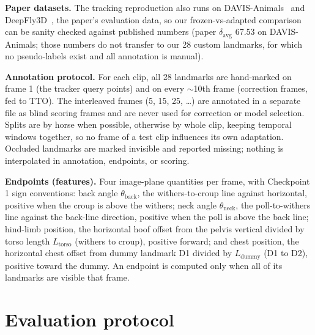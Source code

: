\documentclass[11pt]{article}
\begin{document}
\textbf{Paper datasets.} The tracking reproduction also runs on
DAVIS-Animals~\cite{davis} and DeepFly3D~\cite{deepfly3d}, the paper's
evaluation data, so our frozen-vs-adapted comparison can be sanity
checked against published numbers (paper $\delta_{\text{avg}}$ 67.53 on
DAVIS-Animals; those numbers do not transfer to our 28 custom
landmarks, for which no pseudo-labels exist and all annotation is
manual).

\textbf{Annotation protocol.} For each clip, all 28 landmarks are
hand-marked on frame 1 (the tracker query points) and on every
$\sim$10th frame (correction frames, fed to TTO). The interleaved
frames (5, 15, 25, \dots) are annotated in a separate file as blind
scoring frames and are never used for correction or model selection.
Splits are by horse when possible, otherwise by whole clip, keeping
temporal windows together, so no frame of a test clip influences its
own adaptation. Occluded landmarks are marked invisible and reported
missing; nothing is interpolated in annotation, endpoints, or scoring.

\textbf{Endpoints (features).} Four image-plane quantities per frame,
with Checkpoint 1 sign conventions: back angle
$\theta_{\text{back}}$, the withers-to-croup line against horizontal,
positive when the croup is above the withers; neck angle
$\theta_{\text{neck}}$, the poll-to-withers line against the back-line
direction, positive when the poll is above the back line; hind-limb
position, the horizontal hoof offset from the pelvis vertical divided
by torso length $L_{\text{torso}}$ (withers to croup), positive
forward; and chest position, the horizontal chest offset from dummy
landmark D1 divided by $L_{\text{dummy}}$ (D1 to D2), positive toward
the dummy. An endpoint is computed only when all of its landmarks are
visible that frame.

\section{Evaluation protocol}
\end{document}
